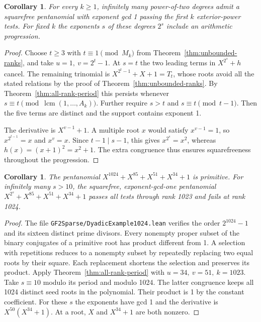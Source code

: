 \documentclass[11pt]{article}
\newtheorem{corollary}[theorem]{Corollary}
\begin{document}
\begin{corollary}\label{cor:dyadic-unbounded}
For every \(k\ge1\), infinitely many power-of-two degrees admit a
squarefree pentanomial with exponent gcd 1 passing the first \(k\)
exterior-power tests. For fixed \(k\) the exponents \(s\) of these
degrees \(2^s\) include an arithmetic progression.
\end{corollary}
\begin{proof}
Choose \(t\ge3\) with \(t\equiv1\pmod{M_k}\) from
Theorem~\ref{thm:unbounded-ranks}, and take \(u=1,\ v=2^t-1\).
At \(s=t\) the two leading terms in \(X^{2^s}+h\) cancel. The
remaining trinomial is \(X^{2^t-1}+X+1=T_t\), whose roots avoid all
the stated relations by the proof of Theorem~\ref{thm:unbounded-ranks}.
By Theorem~\ref{thm:all-rank-period} this persists whenever
\(s\equiv t\pmod{\operatorname{lcm}(1,\ldots,A_k)}\). Further
require \(s>t\) and \(s\equiv t\pmod{t-1}\). Then the five terms
are distinct and the support contains exponent 1.

The derivative is \(X^{v-1}+1\). A multiple root \(x\) would satisfy
\(x^{v-1}=1\), so \(x^{2^{t-1}}=x\) and \(x^v=x\).
Since \(t-1\mid s-1\), this gives \(x^{2^s}=x^2\), whereas
\(h(x)=(x+1)^2=x^2+1\). The extra congruence thus ensures
squarefreeness throughout the progression.
\end{proof}

\begin{corollary}\label{cor:first-failure-1024}
The pentanomial \(X^{1024}+X^{85}+X^{51}+X^{34}+1\) is primitive.
For infinitely many \(s>10\), the squarefree, exponent-gcd-one
pentanomial \(X^{2^s}+X^{85}+X^{51}+X^{34}+1\) passes all tests
through rank 1023 and fails at rank 1024.
\end{corollary}
\begin{proof}
The file \texttt{GF2Sparse/DyadicExample1024.lean} verifies the order
\(2^{1024}-1\) and its sixteen distinct prime divisors. Every
nonempty proper subset of the binary conjugates of a primitive root
has product different from 1. A selection with repetitions reduces to
a nonempty subset by repeatedly replacing two equal roots by their square.
Each replacement shortens the selection and preserves its product.
Apply Theorem~\ref{thm:all-rank-period} with \(u=34,\ v=51,\ k=1023\).
Take \(s\equiv10\) modulo its period and modulo 1024. The latter
congruence keeps all 1024 distinct seed roots in the polynomial.
Their product is 1 by the constant coefficient. For these \(s\) the
exponents have gcd 1 and the derivative is \(X^{50}(X^{34}+1)\).
At a root, \(X\) and \(X^{34}+1\) are both nonzero.
\end{proof}
\end{document}
